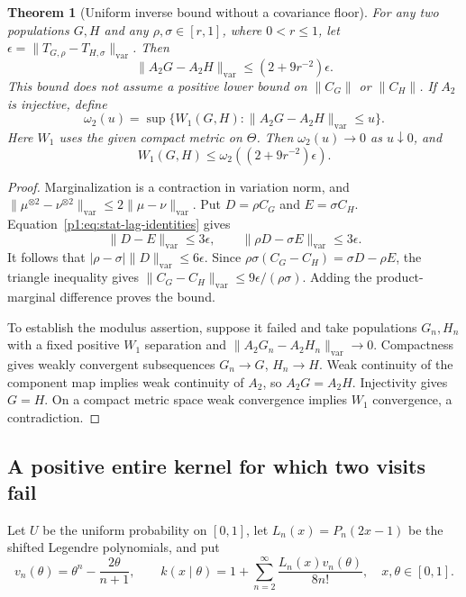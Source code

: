 \documentclass[11pt,a4paper]{article}
\newtheorem{theorem}{Theorem}[section]
\theoremstyle{definition}
\theoremstyle{remark}
\numberwithin{equation}{section}
\begin{document}
\begin{theorem}[Uniform inverse bound without a covariance floor]
\label{p1:thm:stat-refresh-stability}
For any two populations $G,H$ and any $\rho,\sigma\in[r,1]$, where $0<r\le1$,
let $\epsilon=\|T_{G,\rho}-T_{H,\sigma}\|_{\mathrm{var}}$.  Then
\begin{equation}\label{p1:eq:stat-inverse-bound}
 \|A_2G-A_2H\|_{\mathrm{var}}
       \le (2+9r^{-2})\epsilon.
\end{equation}
This bound does not assume a positive lower bound on $\|C_G\|$ or
$\|C_H\|$.  If $A_2$ is injective, define
\[
 \omega_2(u)=\sup\{W_1(G,H):
      \|A_2G-A_2H\|_{\mathrm{var}}\le u\}.
\]
Here $W_1$ uses the given compact metric on $\Theta$.  Then $\omega_2(u)\to0$
as $u\downarrow0$, and
\[
 W_1(G,H)\le\omega_2((2+9r^{-2})\epsilon).
\]
\end{theorem}
\begin{proof}
Marginalization is a contraction in variation norm, and
$\|\mu^{\otimes2}-\nu^{\otimes2}\|_{\mathrm{var}}
\le2\|\mu-\nu\|_{\mathrm{var}}$.  Put
$D=\rho C_G$ and $E=\sigma C_H$.  Equation~\eqref{p1:eq:stat-lag-identities}
gives
\[
 \|D-E\|_{\mathrm{var}}\le3\epsilon,
 \qquad\|\rho D-\sigma E\|_{\mathrm{var}}\le3\epsilon.
\]
It follows that
$|\rho-\sigma|\|D\|_{\mathrm{var}}\le6\epsilon$.  Since
$\rho\sigma(C_G-C_H)=\sigma D-\rho E$, the triangle inequality gives
$\|C_G-C_H\|_{\mathrm{var}}\le9\epsilon/(\rho\sigma)$.
Adding the product-marginal difference proves the bound.

To establish the modulus assertion, suppose it failed and take populations
$G_n,H_n$ with a fixed positive $W_1$ separation and
$\|A_2G_n-A_2H_n\|_{\mathrm{var}}\to0$.  Compactness gives weakly convergent
subsequences $G_n\to G$, $H_n\to H$.  Weak continuity of the component map
implies weak continuity of $A_2$, so $A_2G=A_2H$.  Injectivity gives $G=H$.
On a compact metric space weak convergence implies $W_1$ convergence, a
contradiction.
\end{proof}

\subsection{A positive entire kernel for which two visits fail}

Let $U$ be the uniform probability on $[0,1]$, let $L_n(x)=P_n(2x-1)$ be
the shifted Legendre polynomials, and put
\begin{equation}\label{p1:eq:stat-kernel}
 v_n(\theta)=\theta^n-\frac{2\theta}{n+1},\qquad
 k(x\mid\theta)=1+\sum_{n=2}^{\infty}
                \frac{L_n(x)v_n(\theta)}{8n!},
 \quad x,\theta\in[0,1].
\end{equation}
\end{document}
